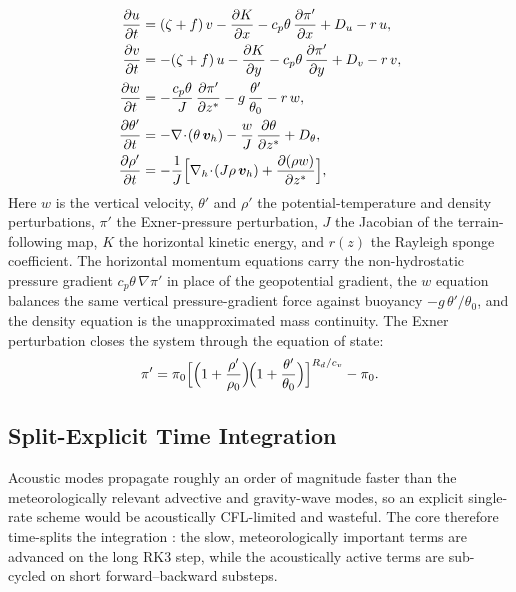 \documentclass[11pt,twoside]{report}
\newcommand{\pp}{\partial}
\newcommand{\Rd}{R_d}
\newcommand{\cpd}{c_p}
\newcommand{\cvd}{c_v}
\newcommand{\vect}[1]{\bm{#1}}
\newcommand{\grad}{\nabla}
\newcommand{\divg}{\nabla\!\cdot\!}
\begin{document}
\begin{align}
  \frac{\pp u}{\pp t} &= (\zeta+f)\,v - \frac{\pp K}{\pp x}
  - \cpd\theta\,\frac{\pp\pi'}{\pp x} + D_u - r\,u,
  \label{eq:nh-u}\\
  \frac{\pp v}{\pp t} &= -(\zeta+f)\,u - \frac{\pp K}{\pp y}
  - \cpd\theta\,\frac{\pp\pi'}{\pp y} + D_v - r\,v,
  \label{eq:nh-v}\\
  \frac{\pp w}{\pp t} &= -\frac{\cpd\theta}{J}\,\frac{\pp\pi'}{\pp z^*}
  - g\,\frac{\theta'}{\theta_0} - r\,w,
  \label{eq:nh-w}\\
  \frac{\pp\theta'}{\pp t} &= -\divg(\theta\,\vect{v}_h)
  - \frac{w}{J}\,\frac{\pp\theta}{\pp z^*} + D_\theta,
  \label{eq:nh-theta}\\
  \frac{\pp\rho'}{\pp t} &= -\frac{1}{J}
  \Bigl[\grad_h\!\cdot\!(J\rho\,\vect{v}_h)
  + \frac{\pp(\rho w)}{\pp z^*}\Bigr],
  \label{eq:nh-rho}
\end{align}
Here $w$ is the vertical velocity, $\theta'$ and $\rho'$ the potential-temperature
and density perturbations, $\pi'$ the Exner-pressure perturbation, $J$ the
Jacobian of the terrain-following map, $K$ the horizontal kinetic energy, and
$r(z)$ the Rayleigh sponge coefficient. The horizontal momentum equations carry
the non-hydrostatic pressure gradient $\cpd\theta\,\grad\pi'$ in place of the
geopotential gradient, the $w$ equation balances the same vertical
pressure-gradient force against buoyancy $-g\,\theta'/\theta_0$, and the density
equation is the unapproximated mass continuity. The Exner perturbation closes
the system through the equation of state:
\begin{equation}
  \pi' = \pi_0\Bigl[\Bigl(1+\frac{\rho'}{\rho_0}\Bigr)\!
  \Bigl(1+\frac{\theta'}{\theta_0}\Bigr)\Bigr]^{\Rd/\cvd}-\pi_0.
\end{equation}

\subsection{Split-Explicit Time Integration}

Acoustic modes propagate roughly an order of magnitude faster than the
meteorologically relevant advective and gravity-wave modes, so an explicit
single-rate scheme would be acoustically CFL-limited and wasteful. The core
therefore time-splits the integration \citep{WickerSkamarock2002,Klemp2007}:
the slow, meteorologically important terms are advanced on the long RK3 step,
while the acoustically active terms are sub-cycled on short forward--backward
substeps.
\end{document}
